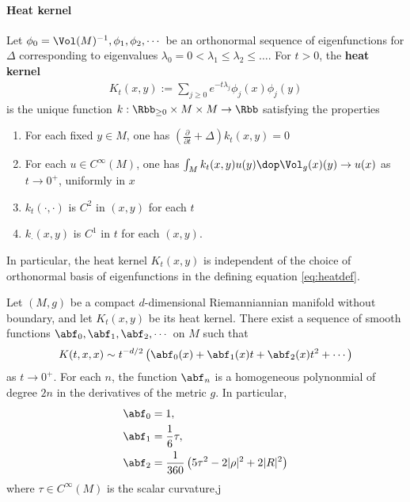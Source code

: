     \paragraph{Heat kernel}
    Let $\phi_0=\Vol(M)^{-1},\phi_1,\phi_2,\cdots$ be an orthonormal sequence of eigenfunctions for $\Delta$ corresponding to eigenvalues $\lambda_0=0 <\lambda_1 \leq \lambda_2 \leq \dots$. For $t >0$, the \textbf{heat kernel}
    \begin{align}\label{eq:heatdef}
        K_t(x,y):= \sum_{j\geq 0} e^{-t\lambda_j} \phi_j(x)\phi_j(y)
    \end{align}
    is the unique function $k:\Rbb_{\geq 0} \times M \times M \to \Rbb$ satisfying the properties
    \begin{enumerate}
        \item For each fixed $y\in M$, one has $\left(\frac{\partial}{\partial t} + \Delta \right)k_t(x,y) = 0$
        \item For each $u\in C^\infty(M)$, one has $ \int_M k_t(x,y) u(y)  \dop \Vol_g (x)(y) \to u(x)$  as $t \to 0^+$, uniformly in $x$
        \item $k_t(\cdot,\cdot)$ is $C^2$ in $(x,y)$ for each $t$
        \item $k_\cdot( x,y)$ is $C^1$  in $t$ for each $(x,y)$.
    \end{enumerate}
    In particular, the heat kernel $K_t(x,y)$ is independent of the choice of orthonormal basis of eigenfunctions in the defining equation \ref{eq:heatdef}.

\begin{proposition}\label{prop:asymptoticExpansion}
    Let $(M,g)$ be a compact $d$-dimensional Riemanniannian manifold without boundary, and let $K_t(x,y)$ be its heat kernel.  There exist a sequence of smooth functions $\abf_0,\abf_1, \abf_2,\cdots$ on $M$ such that
    \begin{align}\label{eq:asymptoticExpansion}
        K(t,x,x) \sim t^{-d/2}\left(\abf_0(x)+ \abf_1(x) t + \abf_2(x) t^2 +\cdots  \right)
    \end{align}
    as $t \to 0^+$. For each $n$, the function $\abf_n$ is a homogeneous polynonmial of degree $2n$ in the derivatives of the metric $g$.
    In particular,
    \begin{align}
        \abf_0 & = 1,                                                       \\
        \abf_1 & =\frac{1}{6} \tau,                                         \\
        \abf_2 & =\frac{1}{360}\left( 5\tau^2 - 2 |\rho|^2 +2 |R|^2 \right)
    \end{align}
    where $\tau \in C^\infty(M)$ is the scalar curvature,j
\end{proposition}













\newpage








